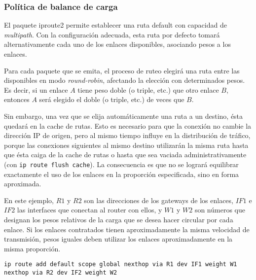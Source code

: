 \subsubsection{Política de balance de carga}
El paquete iproute2 permite establecer una ruta default con capacidad de \textit{multipath}. Con la configuración adecuada, esta ruta por defecto tomará alternativamente cada uno de los enlaces disponibles, asociando pesos a los enlaces. 

Para cada paquete que se emita, el proceso de ruteo elegirá una ruta entre las disponibles en modo \textit{round-robin}, afectando la elección con determinados pesos. Es decir, si un enlace $A$ tiene peso doble (o triple, etc.) que otro enlace $B$, entonces $A$ será elegido el doble (o triple, etc.) de veces que $B$. 

Sin embargo, una vez que se elija automáticamente una ruta a un destino, ésta quedará en la cache de rutas. Esto es necesario para que la conexión no cambie la dirección IP de origen, pero al mismo tiempo influye en la distribución de tráfico, porque las conexiones siguientes al mismo destino utilizarán la misma ruta hasta que ésta caiga de la cache de rutas o hasta que sea vaciada administrativamente (con \texttt{ip route flush cache}). La consecuencia es que no se logrará equilibrar exactamente el uso de los enlaces en la proporción especificada, sino en forma aproximada. 
  
En este ejemplo, $R1$ y $R2$ son las direcciones de los gateways de los enlaces, $IF1$ e $IF2$ las interfaces que conectan al router con ellos, y $W1$ y $W2$ son números que designan los pesos relativos de la carga que se desea hacer circular por cada enlace. Si los enlaces contratados tienen aproximadamente la misma velocidad de transmisión, pesos iguales deben utilizar los enlaces aproximadamente en la misma proporción.


\begin{lstlisting}
ip route add default scope global nexthop via R1 dev IF1 weight W1 nexthop via R2 dev IF2 weight W2
\end{lstlisting}


% 
% 

